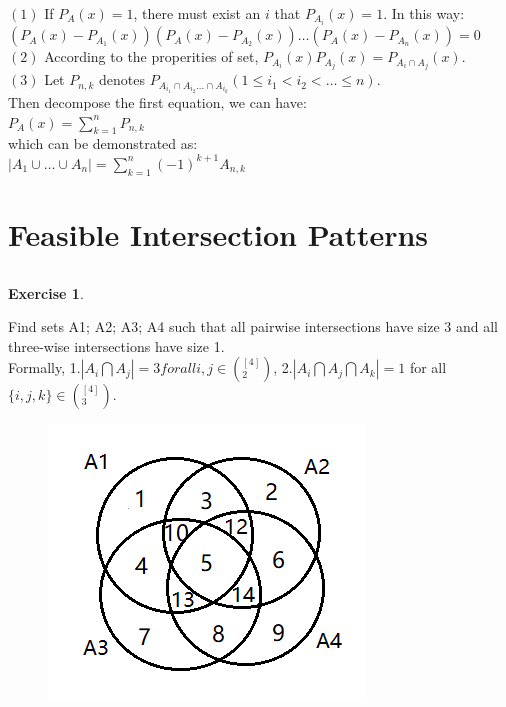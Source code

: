 \documentclass[12pt,a4]{article}
\newtheorem{exercise}[theorem]{Exercise}
\begin{document}
\begin{enumerate}
    $(1)$ If $P_A(x) = 1$, there must exist an $i$ that $P_{A_i}(x) = 1$. In this way:\\
    $(P_A(x) - P_{A_1}(x))(P_A(x) - P_{A_2}(x))\ldots(P_A(x) - P_{A_n}(x)) = 0$\\

    $(2)$ According to the properities of set, $P_{A_i}(x)P_{A_j}(x) = P_{A_i \cap A_j}(x)$.\\

    $(3)$ Let $P_{n,k}$ denotes $P_{A_{i_1}\cap A_{i_2}\ldots\cap A_{i_k}}(1\le i_1<i_2<\ldots\le n)$.\\
    Then decompose the first equation, we can have:\\
    $P_A(x) = \sum\limits_{k=1}^{n}P_{n,k}$\\
    which can be demonstrated as:\\
     $\left\vert{A_1\cup\ldots\cup A_n}\right\vert = \sum\limits_{k=1}^{n}(-1)^{k+1}A_{n,k}$\\
\end{enumerate}

\section{Feasible Intersection Patterns}

\subsection{}

\begin{exercise}
\end{exercise}
  Find sets A1; A2; A3; A4 such that all pairwise intersections have size 3 and all three-wise intersections have size 1. \\Formally,
 1.$|A_i\bigcap A_j| = 3 for all {i,j} \in (^{[4]}_{2})$,
 2.$|A_i\bigcap A_j\bigcap A_k| = 1$ for all $\{i,j,k\}\in (^{[4]}_{3})$.

    \begin{figure}[H]
	\begin{center}
		\includegraphics[width=0.32\linewidth]{Exercise31-1.png}
		\caption{}
		\label{Fig:1}
	\end{center}
	\vspace{-0.5em}
    \end{figure}
\end{document}
